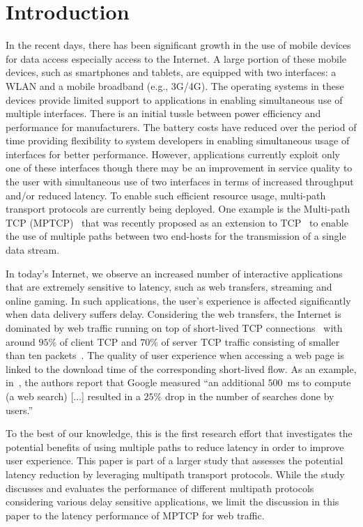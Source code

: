 \section{Introduction}
\label{sec:introduction}
In the recent days, there has been significant growth in the use of mobile devices for data access especially access to the Internet.
A large portion of these mobile devices, such as smartphones and tablets, are equipped with two interfaces: a WLAN and a mobile broadband
(e.g., 3G/4G). The operating systems in these devices provide limited support to applications in enabling simultaneous use of
multiple interfaces. There is an initial tussle between power efficiency and performance for manufacturers. The battery costs
have reduced over the period of time providing flexibility to system developers in enabling simultaneous usage of interfaces for 
better performance. However, applications currently exploit only one of these interfaces though there may be an improvement in service
quality to the user with simultaneous use of two interfaces in terms of increased throughput and/or reduced latency. 
To enable such efficient resource usage, multi-path transport protocols are currently being deployed. 
One example is the Multi-path TCP (MPTCP)~\cite{RFC6824} that was recently proposed as an extension to
TCP~\cite{RFC793} to enable the use of multiple paths between two end-hosts for the transmission of a single data stream.

In today's Internet, we observe an increased number of interactive applications that are extremely sensitive to latency, such as web transfers, 
streaming and online gaming. In such applications, the user's experience is affected significantly when data delivery suffers delay. 
Considering the web transfers, the Internet is dominated by web traffic running on top of short-lived TCP connections~\cite{Labovitz-IOR-2009} with
around $95\%$ of client TCP and $70\%$ of server TCP traffic consisting of smaller than ten packets~\cite{Ciullo-IEEECL-2009}.
The quality of user experience when accessing a web page is linked to the download time of the corresponding short-lived flow. As an example,
in~\cite{why-latency-matters-2013}, the authors report that Google measured ``an additional $500$~ms to compute (a web search) [$\ldots$] resulted in a
$25\%$ drop in the number of searches done by users.''

To the best of our knowledge, this is the first research effort that investigates the potential benefits of using multiple paths to reduce latency in order to 
improve user experience. This paper is part of a larger study that assesses the potential latency reduction by leveraging multipath transport protocols. 
While the study discusses and evaluates the performance of different multipath protocols considering various delay sensitive applications, we limit the 
discussion in this paper to the latency performance of MPTCP for web traffic.

